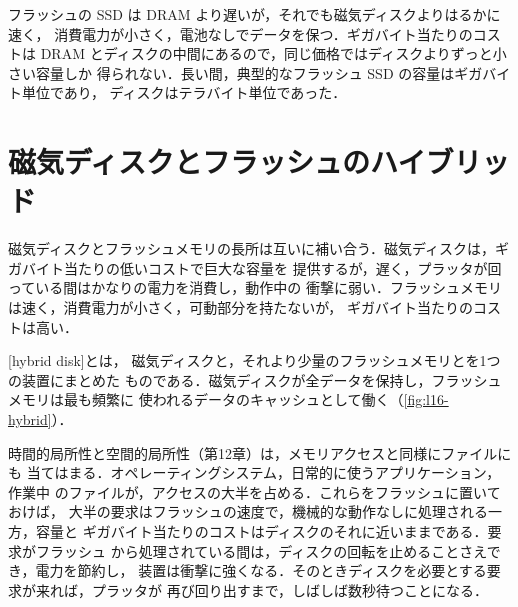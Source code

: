 \documentclass[../main.tex]{subfiles}
\begin{document}

フラッシュの SSD は DRAM より遅いが，それでも磁気ディスクよりはるかに速く，
消費電力が小さく，電池なしでデータを保つ．ギガバイト当たりのコストは DRAM
とディスクの中間にあるので，同じ価格ではディスクよりずっと小さい容量しか
得られない．長い間，典型的なフラッシュ SSD の容量はギガバイト単位であり，
ディスクはテラバイト単位であった．

\section{磁気ディスクとフラッシュのハイブリッド}
\label{sec:l16-hybrid}

磁気ディスクとフラッシュメモリの長所は互いに補い合う．磁気ディスクは，ギガバイト当たりの低いコストで巨大な容量を
提供するが，遅く，プラッタが回っている間はかなりの電力を消費し，動作中の
衝撃に弱い．フラッシュメモリは速く，消費電力が小さく，可動部分を持たないが，
ギガバイト当たりのコストは高い．

\begin{definition}[ハイブリッドディスク]
  [hybrid disk]とは，
  磁気ディスクと，それより少量のフラッシュメモリとを1つの装置にまとめた
  ものである．磁気ディスクが全データを保持し，フラッシュメモリは最も頻繁に
  使われるデータのキャッシュとして働く（\cref{fig:l16-hybrid}）．
\end{definition}

時間的局所性と空間的局所性（第12章）は，メモリアクセスと同様にファイルにも
当てはまる．オペレーティングシステム，日常的に使うアプリケーション，作業中
のファイルが，アクセスの大半を占める．これらをフラッシュに置いておけば，
大半の要求はフラッシュの速度で，機械的な動作なしに処理される一方，容量と
ギガバイト当たりのコストはディスクのそれに近いままである．要求がフラッシュ
から処理されている間は，ディスクの回転を止めることさえでき，電力を節約し，
装置は衝撃に強くなる．そのときディスクを必要とする要求が来れば，プラッタが
再び回り出すまで，しばしば数秒待つことになる．

\begin{marginfigure}
  
  \caption{ハイブリッドディスク．大半の要求はフラッシュのキャッシュが
    処理する．}
  \label{fig:l16-hybrid}
\end{marginfigure}
\end{document}
